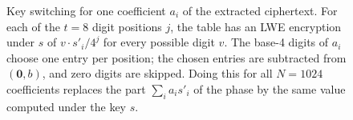 \begin{figure}[!htb]
\centering

\caption{Key switching for one coefficient $a_i$ of the extracted ciphertext.
For each of the $t=8$ digit positions $j$, the table has an LWE encryption
under $s$ of $v\cdot s'_i/4^j$ for every possible digit $v$. The base-4 digits of
$a_i$ choose one entry per position; the chosen entries are subtracted from
$(\mathbf 0,b)$, and zero digits are skipped. Doing this for all $N=1024$
coefficients replaces the part $\sum_ia_is'_i$ of the phase by the same value
computed under the key $s$.}
\label{fig:kstable}
\end{figure}
